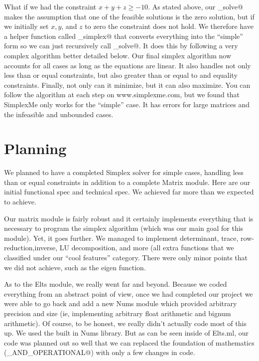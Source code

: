 \documentclass[letterpaper,11pt]{article}
\begin{document}
What if we had the constraint $x + y + z \geq -10$. As stated above, our
\verb@simple_solve@ makes the assumption that one of the feasible solutions is
the zero solution, but if we initially set $x, y$, and $z$ to zero the
constraint does not hold. We therefore have a helper function called
\verb@initialize_simplex@ that converts everything into the ``simple'' form so
we can just recursively call \verb@simple_solve@. It does this by following a
very complex algorithm better detailed below. Our final  simplex algorithm now
accounts for all cases as long as the equations are linear. It also handles not
only less than or equal constraints, but also greater than or equal to and
equality constraints.  Finally, not only can it minimize, but it can also
maximize. You can follow the algorithm at each step on www.simplexme.com, but we
found that SimplexMe only works for the ``simple'' case. It has errors for large
matrices and the infeasible and unbounded cases. 
	
\section{Planning}

We planned to have a completed Simplex solver for simple cases, handling less
than or equal constraints in addition to a complete Matrix module. Here are our
initial functional spec and technical spec. We achieved far more than we
expected to achieve. 

Our matrix module is fairly robust and it certainly implements everything that
is necessary to program the simplex algorithm (which was our main goal for this
module). Yet, it goes further. We managed to implement determinant, trace,
row-reduction,inverse, LU decomposition, and more (all extra functions that we
classified under our ``cool features'' category. There were only minor
points that we did not achieve, such as the eigen function.

As to the Elts module, we really went far and beyond. Because we coded
everything from an abstract point of view, once we had completed our project we
were able to go back and add a new Nums module which provided arbitrary
precision and size (ie, implementing arbitrary float arithmetic and bignum
arithmetic). Of course, to be honest, we really didn't actually code most of
this up. We used the built in Nums library. But as can be seen inside of
Elts.ml, our code was planned out so well that we can replaced the foundation of
mathematics (\verb@ORDERED_AND_OPERATIONAL@) with only a few changes in code.
\end{document}
